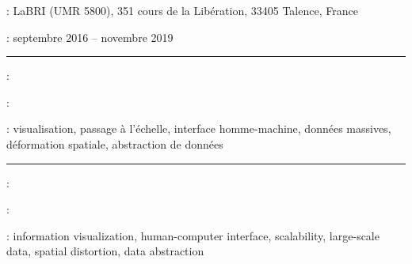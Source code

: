 

\noindent{}:
LaBRI (UMR 5800), 351 cours de la Libération, 33405 Talence, France

\smallskip
\noindent{}: septembre 2016 -- novembre 2019
\begin{center}
\noindent\rule{.5\textwidth}{0.7pt}
\end{center}
\smallskip
\noindent{} : \myTitle
\smallskip

\noindent{}:
\lipsum[2-4]

\smallskip
\noindent{}: visualisation, passage à l'échelle, interface homme-machine, données massives, déformation spatiale, abstraction de données


\begin{center}
\noindent\rule{.5\textwidth}{0.6pt}
\end{center}


\noindent{} : \EnglishTitle
\smallskip

\noindent{}:

\lipsum[2-4]

\smallskip

\noindent{}: information visualization, human-computer interface, scalability, large-scale data, spatial distortion, data abstraction


